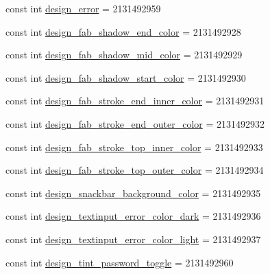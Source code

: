 \begin{DoxyCompactItemize}
\item 
const int \mbox{\hyperlink{class_f_w_p_s___app_1_1_droid_1_1_resource_1_1_color_a5658c8e09fe3327819153e168434d562}{design\+\_\+error}} = 2131492959
\item 
const int \mbox{\hyperlink{class_f_w_p_s___app_1_1_droid_1_1_resource_1_1_color_af670143bde3ec7cba873e60e97761060}{design\+\_\+fab\+\_\+shadow\+\_\+end\+\_\+color}} = 2131492928
\item 
const int \mbox{\hyperlink{class_f_w_p_s___app_1_1_droid_1_1_resource_1_1_color_a2001b77a1031fb4d9a08d02036fb1cd7}{design\+\_\+fab\+\_\+shadow\+\_\+mid\+\_\+color}} = 2131492929
\item 
const int \mbox{\hyperlink{class_f_w_p_s___app_1_1_droid_1_1_resource_1_1_color_ac74cac7d0a09f213ac1415a56d519358}{design\+\_\+fab\+\_\+shadow\+\_\+start\+\_\+color}} = 2131492930
\item 
const int \mbox{\hyperlink{class_f_w_p_s___app_1_1_droid_1_1_resource_1_1_color_a8a3b59511f0764769dad35584e9f3f39}{design\+\_\+fab\+\_\+stroke\+\_\+end\+\_\+inner\+\_\+color}} = 2131492931
\item 
const int \mbox{\hyperlink{class_f_w_p_s___app_1_1_droid_1_1_resource_1_1_color_af5bcf5de7eeb33ff86638954ff7d57ab}{design\+\_\+fab\+\_\+stroke\+\_\+end\+\_\+outer\+\_\+color}} = 2131492932
\item 
const int \mbox{\hyperlink{class_f_w_p_s___app_1_1_droid_1_1_resource_1_1_color_a530d78274262b29bcebfe89afd50a1b1}{design\+\_\+fab\+\_\+stroke\+\_\+top\+\_\+inner\+\_\+color}} = 2131492933
\item 
const int \mbox{\hyperlink{class_f_w_p_s___app_1_1_droid_1_1_resource_1_1_color_a7404a6b77a0e18b3aa7473e03f8b2542}{design\+\_\+fab\+\_\+stroke\+\_\+top\+\_\+outer\+\_\+color}} = 2131492934
\item 
const int \mbox{\hyperlink{class_f_w_p_s___app_1_1_droid_1_1_resource_1_1_color_a0364e8205dbec3a457e3da3eedbb1f3f}{design\+\_\+snackbar\+\_\+background\+\_\+color}} = 2131492935
\item 
const int \mbox{\hyperlink{class_f_w_p_s___app_1_1_droid_1_1_resource_1_1_color_addb708bcecbe2d0f74b88fa6d0aa0d30}{design\+\_\+textinput\+\_\+error\+\_\+color\+\_\+dark}} = 2131492936
\item 
const int \mbox{\hyperlink{class_f_w_p_s___app_1_1_droid_1_1_resource_1_1_color_aa782d68c123d3f9c58e0f7b19dbbe2aa}{design\+\_\+textinput\+\_\+error\+\_\+color\+\_\+light}} = 2131492937
\item 
const int \mbox{\hyperlink{class_f_w_p_s___app_1_1_droid_1_1_resource_1_1_color_acc4792c346b98eb328a5e04ff3eb5406}{design\+\_\+tint\+\_\+password\+\_\+toggle}} = 2131492960

\end{DoxyCompactItemize}
